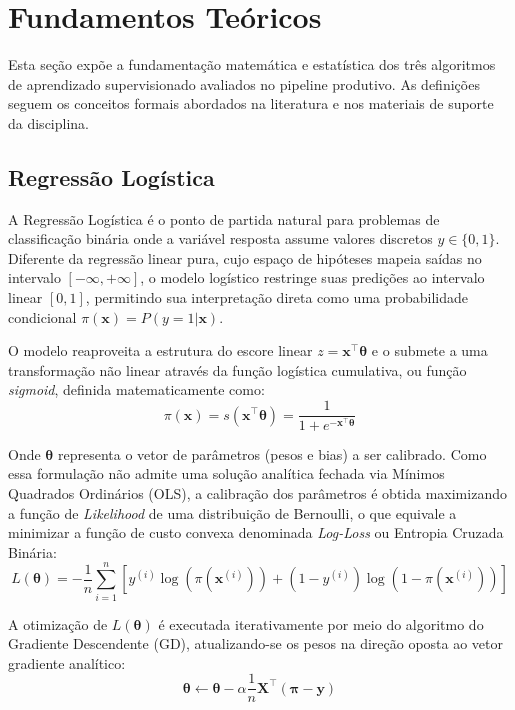 \documentclass[12pt, a4paper]{article}
\begin{document}
\section{Fundamentos Teóricos}

Esta seção expõe a fundamentação matemática e estatística dos três algoritmos de aprendizado supervisionado avaliados no pipeline produtivo. As definições seguem os conceitos formais abordados na literatura e nos materiais de suporte da disciplina.

\subsection{Regressão Logística}

A Regressão Logística é o ponto de partida natural para problemas de classificação binária onde a variável resposta assume valores discretos $y \in \{0, 1\}$. Diferente da regressão linear pura, cujo espaço de hipóteses mapeia saídas no intervalo $[-\infty, +\infty]$, o modelo logístico restringe suas predições ao intervalo linear $[0, 1]$, permitindo sua interpretação direta como uma probabilidade condicional $\pi(\mathbf{x}) = P(y=1|\mathbf{x})$.

O modelo reaproveita a estrutura do escore linear $z = \mathbf{x}^\top \boldsymbol{\theta}$ e o submete a uma transformação não linear através da função logística cumulativa, ou função \textit{sigmoid}, definida matematicamente como:
\begin{equation}
\pi(\mathbf{x}) = s(\mathbf{x}^\top \boldsymbol{\theta}) = \frac{1}{1 + e^{-\mathbf{x}^\top \boldsymbol{\theta}}}
\end{equation}

Onde $\boldsymbol{\theta}$ representa o vetor de parâmetros (pesos e bias) a ser calibrado. Como essa formulação não admite uma solução analítica fechada via Mínimos Quadrados Ordinários (OLS), a calibração dos parâmetros é obtida maximizando a função de \textit{Likelihood} de uma distribuição de Bernoulli, o que equivale a minimizar a função de custo convexa denominada \textit{Log-Loss} ou Entropia Cruzada Binária:
\begin{equation}
L(\boldsymbol{\theta}) = -\frac{1}{n} \sum_{i=1}^{n} \left[ y^{(i)} \log(\pi(\mathbf{x}^{(i)})) + (1 - y^{(i)}) \log(1 - \pi(\mathbf{x}^{(i)})) \right]
\end{equation}

A otimização de $L(\boldsymbol{\theta})$ é executada iterativamente por meio do algoritmo do Gradiente Descendente (GD), atualizando-se os pesos na direção oposta ao vetor gradiente analítico:
\begin{equation}
\boldsymbol{\theta} \leftarrow \boldsymbol{\theta} - \alpha \frac{1}{n} \mathbf{X}^\top (\boldsymbol{\pi} - \mathbf{y})
\end{equation}
\end{document}
